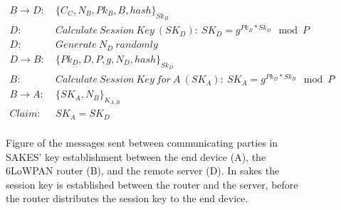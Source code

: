 \begin{figure}[h]
\begin{tcolorbox}[title=Key Establishment in SAKES]
\begin{align*}
B \rightarrow D:\ & \{C_C, N_B, Pk_B, B, hash\}_{Sk_B} \\
D:\ & Calculate\ Session\ Key\ (SK_D):\ SK_D = g^{Pk_B * Sk_D} \mod{P}\\
D:\ & Generate\ N_D\ randomly\\
D \rightarrow B:\ & \{Pk_D, D, P, g, N_D, hash\}_{Sk_D}\\
B:\ & Calculate\ Session\ Key\ for\ A\ (SK_A):\ SK_A = g^{Pk_D * Sk_B} \mod{P}\\
B \rightarrow A:\ & \{SK_A, N_B\}_{K_{A,B}}\\
Claim:\ & SK_A = SK_D\\
\end{align*}
\end{tcolorbox}
\caption{Figure of the messages sent between communicating parties in SAKES' key establishment between the end device (A), the 6LoWPAN router (B), and the remote server (D). In \gls{sakes} the session key is established between the router and the server, before the router distributes the session key to the end device.}
\label{fig:sakes-keys}
\end{figure}

